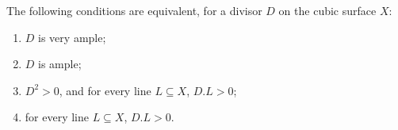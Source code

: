 The following conditions are equivalent, for a divisor $D$ on the cubic surface $X$:

\begin{enumerate}
\item[(i)] $D$ is very ample;
\item[(ii)] $D$ is ample;
\item[(iii)] $D^2 > 0$, and for every line $L \subseteq X$, $D.L > 0$;
\item[(iv)] for every line $L \subseteq X$, $D.L > 0$.
\end{enumerate}
